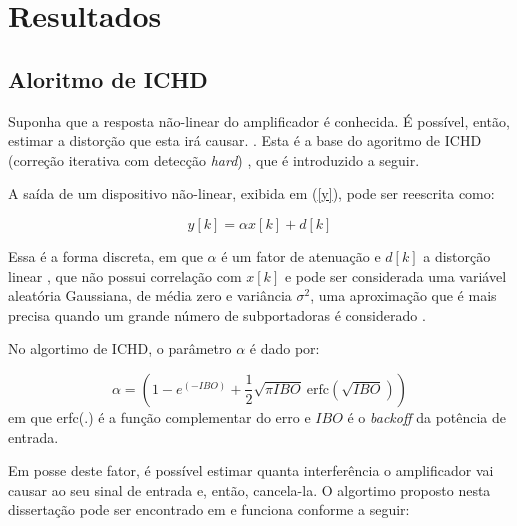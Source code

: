  \chapter{Resultados} \label{capitulo5}

\section{Aloritmo de ICHD}

\par Suponha que a resposta não-linear do amplificador é conhecida. É possível, então, estimar a distorção que esta irá causar. \cite{Uilian}. Esta é a base do agoritmo de ICHD (correção iterativa com detecção \textit{hard}) \cite{Chen}, que é introduzido a seguir. \par A saída de um dispositivo não-linear, exibida em (\ref{y}), pode ser reescrita como\cite{Papoulis}:

\begin{equation}
y[k] = \alpha x[k] + d[k]
\end{equation}
\par Essa é a forma discreta, em que  $\alpha$ é um fator de atenuação e $d[k]$  a distorção linear \cite{Uilian2}, que não possui correlação com $x[k]$  e pode ser considerada uma variável aleatória Gaussiana, de média zero e variância $\sigma^2$, uma aproximação que é mais precisa quando um grande número de subportadoras é considerado \cite{Uilian2}.

\par No algortimo de ICHD, o parâmetro $\alpha$ é dado por:

\begin{equation}
\alpha = \left(1-e^{(-IBO)} + {\frac{1}{2}}\sqrt{\pi IBO}~\text{erfc}(\sqrt{IBO})\right)
\end{equation}
em que erfc(.) é a função complementar do erro e $IBO$ é o \textit{backoff} da potência de entrada.

\par Em posse deste fator, é possível estimar quanta interferência o amplificador vai causar ao seu sinal de entrada e, então, cancela-la. O algortimo proposto nesta dissertação pode ser encontrado em \cite{Uilian2} \cite{Chen} e funciona conforme a seguir:

